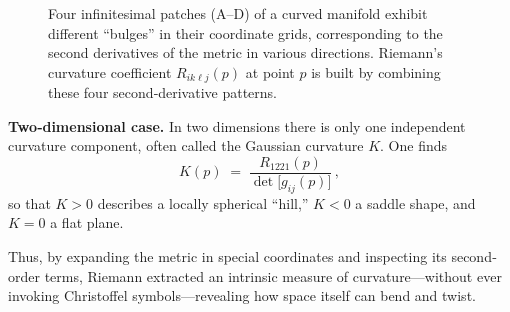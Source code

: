 \begin{figure}[H]
    \centering
    \caption{%
    Four infinitesimal patches (A–D) of a curved manifold exhibit different “bulges” in their coordinate grids, corresponding to the second derivatives of the metric in various directions.  Riemann’s curvature coefficient \(R_{i k \ell j}(p)\) at point \(p\) is built by combining these four second‐derivative patterns.}
    \end{figure}
    







\textbf{Two‐dimensional case.}  In two dimensions there is only one independent curvature component, often called the Gaussian curvature \(K\).  One finds
\[
K(p)
\;=\;
\frac{R_{1 2 2 1}(p)}{\det\bigl[g_{ij}(p)\bigr]}\,,
\]
so that \(K>0\) describes a locally spherical “hill,” \(K<0\) a saddle shape, and \(K=0\) a flat plane.

\medskip
Thus, by expanding the metric in special coordinates and inspecting its second‐order terms, Riemann extracted an intrinsic measure of curvature—without ever invoking Christoffel symbols—revealing how space itself can bend and twist.  




